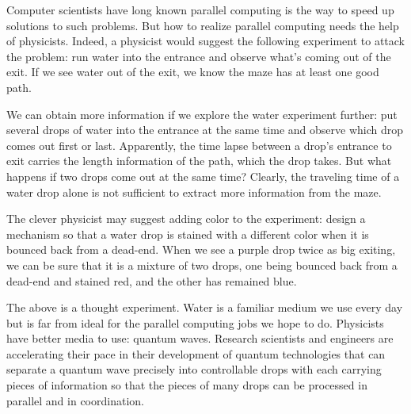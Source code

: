 \documentclass[oneside, letter, 12pt]{book}
\begin{document}
Computer scientists have long known parallel computing is the way to speed up solutions to such problems. But how to realize parallel computing needs the help of physicists. Indeed, a physicist would suggest the following experiment to attack the problem: run water into the entrance and observe what's coming out of the exit. If we see water out of the exit, we know the maze has at least one good path.

We can obtain more information if we explore the water experiment further: put several drops of water into the entrance at the same time and observe which drop comes out first or last. Apparently, the time lapse between a drop's entrance to exit carries the length information of the path, which the drop takes. But what happens if two drops come out at the same time? Clearly, the traveling time of a water drop alone is not sufficient to extract more information from the maze.

The clever physicist may suggest adding color to the experiment: design a mechanism so that a water drop is stained with a different color when it is bounced back from a dead-end. When we see a purple drop twice as big exiting, we can be sure that it is a mixture of two drops, one being bounced back from a dead-end and stained red, and the other has remained blue.

The above is a thought experiment. Water is a familiar medium we use every day but is far from ideal for the parallel computing jobs we hope to do. Physicists have better media to use: quantum waves. Research scientists and engineers are accelerating their pace in their development of quantum technologies that can separate a quantum wave precisely into controllable drops with each carrying pieces of information so that the pieces of many drops can be processed in parallel and in coordination.
\end{document}
